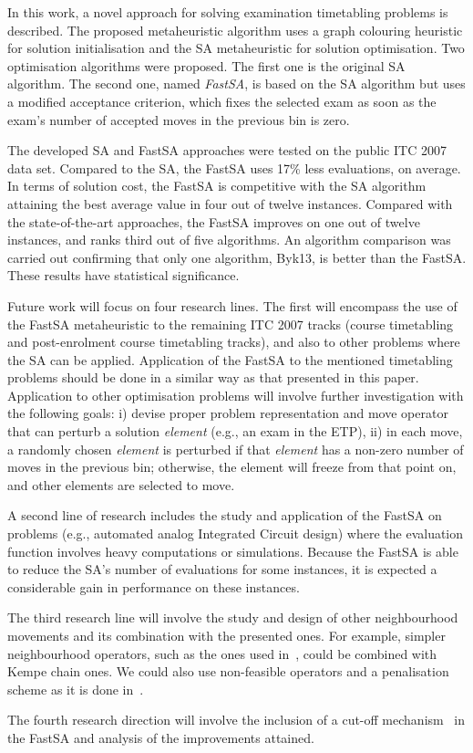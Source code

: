 In this work, a novel approach for solving examination timetabling problems is described. The proposed metaheuristic algorithm uses a graph colouring heuristic for solution initialisation and the SA metaheuristic for solution optimisation. Two optimisation algorithms were proposed. The first one is the original SA algorithm. The second one, named \textit{FastSA}, is based on the SA algorithm but uses a modified acceptance criterion, which fixes the selected exam as soon as the exam's number of accepted moves in the previous bin is zero. 

The developed SA and FastSA approaches were tested on the public ITC 2007 data set. Compared to the SA, the FastSA uses 17\% less evaluations, on average. In terms of solution cost, the FastSA is competitive with the SA algorithm attaining the best average value in four out of twelve instances.  Compared with the state-of-the-art approaches, the FastSA improves on one out of twelve instances, and ranks third out of five algorithms. An algorithm comparison was carried out confirming that only one algorithm, Byk13, is better than the FastSA. These results  have statistical significance.

Future work will focus on four research lines. The first will encompass the use of the FastSA metaheuristic to the remaining ITC 2007 tracks (course timetabling and post-enrolment course timetabling tracks), and also to other problems where the SA can be applied. Application of the FastSA to the mentioned timetabling problems should be done in a similar way as that presented in this paper. Application to other optimisation problems will involve further investigation with the following goals: i) devise proper problem representation and move operator that can perturb a solution \textit{element} (e.g., an exam in the ETP), ii) in each move, a randomly chosen \textit{element} is perturbed if that \textit{element} has a non-zero number of moves in the previous bin; otherwise, the element will freeze from that point on, and other elements are selected to move. 

A second line of research includes the study and application of the FastSA on problems (e.g., automated analog Integrated Circuit design) where the evaluation function involves heavy computations or simulations. Because the FastSA is able to reduce the SA's number of evaluations for some instances, it is expected a considerable gain in performance on these instances.

The third research line will involve the study and design of other neighbourhood movements and its combination with the presented ones. For example, simpler neighbourhood operators, such as the ones used in~\cite{Muller2009}, could be combined with Kempe chain ones. We could also use non-feasible operators and a penalisation scheme as it is done in~\cite{Battistutta2017}.

The fourth research direction will involve the inclusion of a cut-off mechanism~\citep{Johnson1989} in the FastSA and analysis of the improvements attained.



